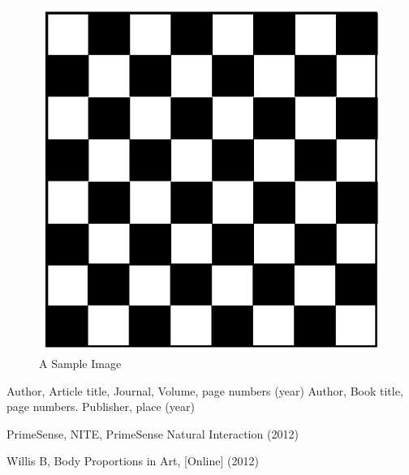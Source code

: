 \documentclass[twocolumn]{svjour3}          %
\begin{document}
\begin{figure}
	\begin{center}
			\includegraphics[width=0.9\columnwidth]{./bwgrid.jpg}
	\end{center}
	\caption{A Sample Image}
	\label{fig:1}
\end{figure}

\begin{thebibliography}{}
Author, Article title, Journal, Volume, page numbers (year)
Author, Book title, page numbers. Publisher, place (year)

PrimeSense, NITE,  PrimeSense Natural Interaction (2012)

Willis B,  Body Proportions in Art,  [Online] (2012)

\end{thebibliography}
\end{document}
